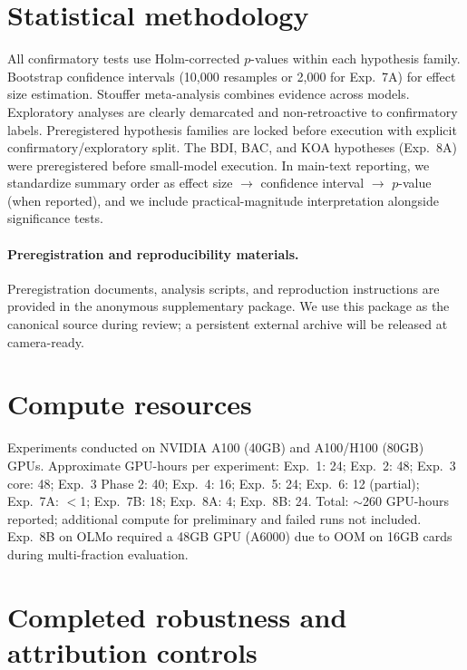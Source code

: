 \documentclass{article}
\begin{document}
\section{Statistical methodology}
\label{app:stats}

All confirmatory tests use Holm-corrected $p$-values within each hypothesis family.
Bootstrap confidence intervals (10,000 resamples or 2,000 for Exp.~7A) for effect size
estimation. Stouffer meta-analysis combines evidence across models. Exploratory analyses
are clearly demarcated and non-retroactive to confirmatory labels. Preregistered hypothesis
families are locked before execution with explicit confirmatory/exploratory split. The
BDI, BAC, and KOA hypotheses (Exp.~8A) were preregistered before small-model execution.
In main-text reporting, we standardize summary order as effect size $\rightarrow$ confidence interval $\rightarrow$ $p$-value (when reported), and we include practical-magnitude interpretation alongside significance tests.

\paragraph{Preregistration and reproducibility materials.}
Preregistration documents, analysis scripts, and reproduction instructions are provided in the anonymous supplementary package. We use this package as the canonical source during review; a persistent external archive will be released at camera-ready.

\section{Compute resources}
\label{app:compute}

Experiments conducted on NVIDIA A100 (40GB) and A100/H100 (80GB) GPUs. Approximate
GPU-hours per experiment: Exp.~1: 24; Exp.~2: 48; Exp.~3 core: 48; Exp.~3 Phase 2: 40;
Exp.~4: 16; Exp.~5: 24; Exp.~6: 12 (partial); Exp.~7A: $<$1; Exp.~7B: 18; Exp.~8A: 4;
Exp.~8B: 24. Total: $\sim$260 GPU-hours reported; additional compute for preliminary and
failed runs not included. Exp.~8B on OLMo required a 48GB GPU (A6000) due to OOM on 16GB
cards during multi-fraction evaluation.

\section{Completed robustness and attribution controls}
\label{app:running}
\end{document}
